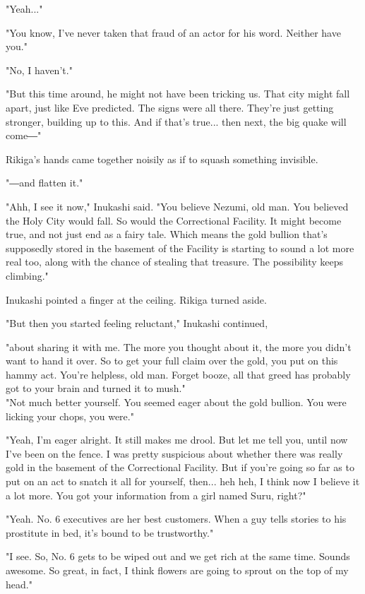 "Yeah..."

"You know, I've never taken that fraud of an actor for his word. Neither
have you."

"No, I haven't."

"But this time around, he might not have been tricking us. That city
might fall apart, just like Eve predicted. The signs were all there.
They're just getting stronger, building up to this. And if that's
true... then next, the big quake will come―"

Rikiga's hands came together noisily as if to squash something
invisible.

"―and flatten it."

"Ahh, I see it now," Inukashi said. "You believe Nezumi, old man. You
believed the Holy City would fall. So would the Correctional Facility.
It might become true, and not just end as a fairy tale. Which means the
gold bullion that's supposedly stored in the basement of the Facility is
starting to sound a lot more real too, along with the chance of stealing
that treasure. The possibility keeps climbing."

Inukashi pointed a finger at the ceiling. Rikiga turned aside.

"But then you started feeling reluctant," Inukashi continued,~

"about sharing it with me. The more you thought about it, the more you
didn't want to hand it over. So to get your full claim over the gold,
you put on this hammy act. You're helpless, old man. Forget booze, all
that greed has probably got to your brain and turned it to mush."\\

"Not much better yourself. You seemed eager about the gold bullion. You
were licking your chops, you were."

"Yeah, I'm eager alright. It still makes me drool. But let me tell you,
until now I've been on the fence. I was pretty suspicious about whether
there was really gold in the basement of the Correctional Facility. But
if you're going so far as to put on an act to snatch it all for
yourself, then... heh heh, I think now I believe it a lot more. You got
your information from a girl named Suru, right?"

"Yeah. No. 6 executives are her best customers. When a guy tells stories
to his prostitute in bed, it's bound to be trustworthy."

"I see. So, No. 6 gets to be wiped out and we get rich at the same time.
Sounds awesome. So great, in fact, I think flowers are going to sprout
on the top of my head."

